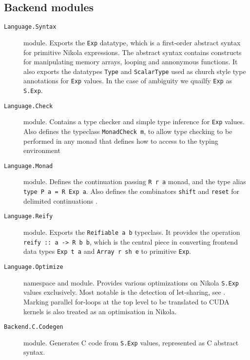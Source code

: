 \subsection*{Backend modules}
\begin{description}

  \item[\texttt{Language.Syntax}] module. Exports the \texttt{Exp} datatype,
    which is a first-order abstract syntax for primitive Nikola expressions.
    The abstract syntax contains constructs for manipulating memory arrays,
    looping and annonymous functions. It also exports the datatypes
    \texttt{Type} and \texttt{ScalarType} used as church style type annotations
    for \texttt{Exp} values. In the case of ambiguity we quailfy \texttt{Exp}
    as \texttt{S.Exp}.

  \item[\texttt{Language.Check}] module. Contains a type checker and simple type
    inference for \texttt{Exp} values. Also defines the typeclass
    \texttt{MonadCheck m}, to allow type checking to be performed in any monad
    that defines how to access to the typing environment

  \item[\texttt{Language.Monad}] module. Defines the continuation passing
    \texttt{R r a} monad, and the type alias \texttt{type P a = R Exp a}.
    Also defines the combinators \texttt{shift} and \texttt{reset} for
    delimited continuations \cite{wadler1994monads}.

  \item[\texttt{Language.Reify}] module. Exports the \texttt{Reifiable a b}
    typeclass. It provides the operation \texttt{reify :: a -> R b b},
    which is the central piece in converting frontend data types
    \texttt{Exp t a} and \texttt{Array r sh e} to primitive \texttt{Exp}.

  \item[\texttt{Language.Optimize}] namespace and module. Provides various
    optimizations on Nikola \texttt{S.Exp} values exclusively. Most notable is
    the detection of let-sharing, see \cite{mainland2010nikola}. Marking
    parallel for-loops at the top level to be translated to CUDA kernels is
    also treated as an optimisation in Nikola.

  \item[\texttt{Backend.C.Codegen}] module. Generates C code from \texttt{S.Exp}
    values, represented as C abstract syntax.

\end{description}

